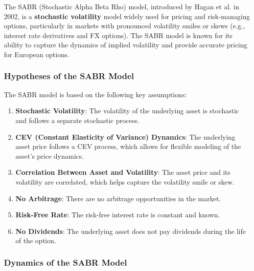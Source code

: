\documentclass[11pt, oneside, a4paper, titlepage]{report}
\begin{document}
The SABR (Stochastic Alpha Beta Rho) model, introduced by Hagan et al. in 2002, is a \textbf{stochastic volatility} model widely used for pricing and risk-managing options, particularly in markets with pronounced volatility smiles or skews (e.g., interest rate derivatives and FX options). The SABR model is known for its ability to capture the dynamics of implied volatility and provide accurate pricing for European options.

\subsubsection{Hypotheses of the SABR Model}

The SABR model is based on the following key assumptions:
\begin{enumerate}
    \item \textbf{Stochastic Volatility}: The volatility of the underlying asset is stochastic and follows a separate stochastic process.
    \item \textbf{CEV (Constant Elasticity of Variance) Dynamics}: The underlying asset price follows a CEV process, which allows for flexible modeling of the asset's price dynamics.
    \item \textbf{Correlation Between Asset and Volatility}: The asset price and its volatility are correlated, which helps capture the volatility smile or skew.
    \item \textbf{No Arbitrage}: There are no arbitrage opportunities in the market.
    \item \textbf{Risk-Free Rate}: The risk-free interest rate is constant and known.
    \item \textbf{No Dividends}: The underlying asset does not pay dividends during the life of the option.
\end{enumerate}

\subsubsection{Dynamics of the SABR Model}
\end{document}
